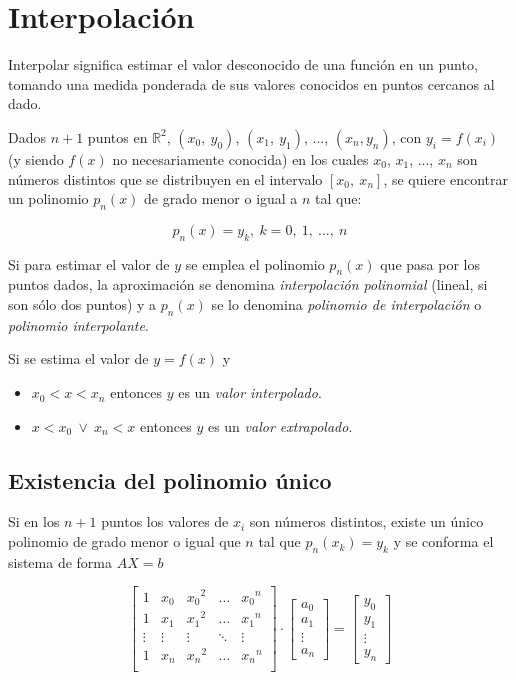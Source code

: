 \documentclass{article}
\begin{document}
\section{Interpolación}

Interpolar significa estimar el valor desconocido de una función en un punto,
tomando una medida ponderada de sus valores conocidos en puntos cercanos al 
dado.

Dados $n+1$ puntos en $\mathbb{R}^2$, $(x_0,\ y_0)$, $(x_1,\ y_1)$, ..., 
$(x_n, y_n)$, con $y_i = f(x_i)$ (y siendo $f(x)$ no necesariamente conocida) en
los cuales $x_0$, $x_1$, ..., $x_n$ son números distintos que se distribuyen en
el intervalo $\left[x_0,\ x_n\right]$, se quiere encontrar un polinomio $p_n(x)$
de grado menor o igual a $n$ tal que:

\[ p_n(x) = y_k,\ k=0,\ 1,\ ...,\ n\]

Si para estimar el valor de $y$ se emplea el polinomio $p_n(x)$ que pasa por los
puntos dados, la aproximación se denomina \emph{interpolación polinomial} 
(lineal, si son sólo dos puntos) y a $p_n(x)$ se lo denomina \emph{polinomio de
interpolación} o \emph{polinomio interpolante}.

Si se estima el valor de $y=f(x)$ y

\begin{itemize}
    \item $x_0<x<x_n$ entonces $y$ es un \emph{valor interpolado}.
    \item $x<x_0\ \lor\ x_n<x$ entonces $y$ es un \emph{valor extrapolado}.
\end{itemize}

\subsection{Existencia del polinomio único}

Si en los $n+1$ puntos los valores de $x_i$ son números distintos, existe un 
único polinomio de grado menor o igual que $n$ tal que $p_n(x_k) = y_k$ y se 
conforma el sistema de forma $AX=b$

\begin{equation*}
    \begin{bmatrix}
        1 & x_0 & {x_0}^2 & \dots & {x_0}^n \\
        1 & x_1 & {x_1}^2 & \dots & {x_1}^n \\
        \vdots & \vdots & \vdots & \ddots & \vdots \\
        1 & x_n & {x_n}^2 & \dots & {x_n}^n \\
    \end{bmatrix} \cdot
    \begin{bmatrix}
        a_0 \\
        a_1 \\
        \vdots \\
        a_n
    \end{bmatrix} = 
    \begin{bmatrix}
        y_0 \\
        y_1 \\
        \vdots \\
        y_n
    \end{bmatrix}
\end{equation*}
\end{document}
